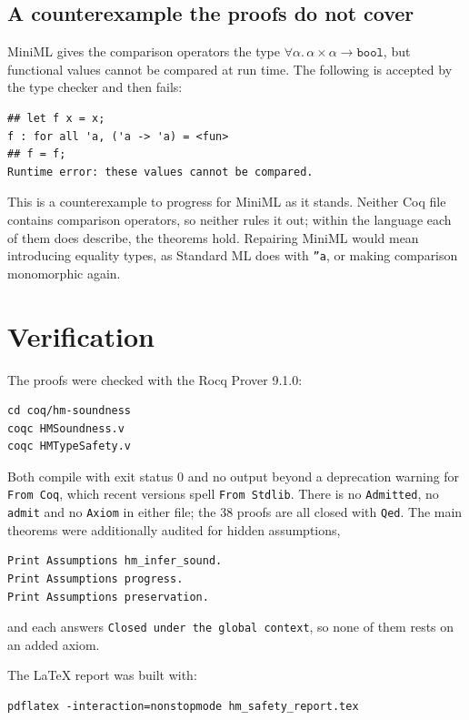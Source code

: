 \documentclass[11pt,a4paper]{article}
\newcommand{\tbool}{\mathtt{bool}}
\begin{document}
\subsection{A counterexample the proofs do not cover}

MiniML gives the comparison operators the type
$\forall\alpha.\,\alpha \times \alpha \to \tbool$, but functional values cannot
be compared at run time.  The following is accepted by the type checker and
then fails:

\begin{lstlisting}
## let f x = x;
f : for all 'a, ('a -> 'a) = <fun>
## f = f;
Runtime error: these values cannot be compared.
\end{lstlisting}

This is a counterexample to progress for MiniML as it stands.  Neither Coq file
contains comparison operators, so neither rules it out; within the language
each of them does describe, the theorems hold.  Repairing MiniML would mean
introducing equality types, as Standard ML does with \texttt{''a}, or making
comparison monomorphic again.

\section{Verification}

The proofs were checked with the Rocq Prover 9.1.0:

\begin{lstlisting}
cd coq/hm-soundness
coqc HMSoundness.v
coqc HMTypeSafety.v
\end{lstlisting}

Both compile with exit status 0 and no output beyond a deprecation warning for
\texttt{From Coq}, which recent versions spell \texttt{From Stdlib}.  There is
no \texttt{Admitted}, no \texttt{admit} and no \texttt{Axiom} in either file;
the 38 proofs are all closed with \texttt{Qed}.  The main theorems were
additionally audited for hidden assumptions,

\begin{lstlisting}
Print Assumptions hm_infer_sound.
Print Assumptions progress.
Print Assumptions preservation.
\end{lstlisting}

and each answers \texttt{Closed under the global context}, so none of them
rests on an added axiom.

The LaTeX report was built with:

\begin{lstlisting}
pdflatex -interaction=nonstopmode hm_safety_report.tex
\end{lstlisting}
\end{document}

